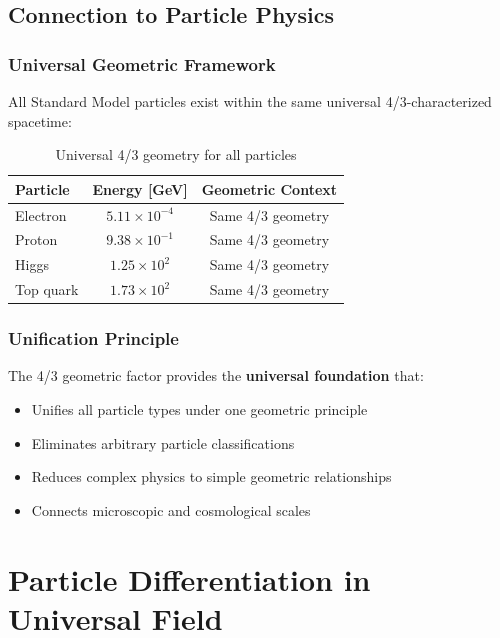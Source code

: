 	\subsection{Connection to Particle Physics}
	\label{subsec:connection_particle_physics}
	
	\subsubsection{Universal Geometric Framework}
	\label{subsubsec:universal_framework}
	
	All Standard Model particles exist within the same universal 4/3-characterized spacetime:
	
	\begin{table}[htbp]
		\centering
		\begin{tabular}{lcc}
			\toprule
			\textbf{Particle} & \textbf{Energy [GeV]} & \textbf{Geometric Context} \\
			\midrule
			Electron & $5.11 \times 10^{-4}$ & Same 4/3 geometry \\
			Proton & $9.38 \times 10^{-1}$ & Same 4/3 geometry \\
			Higgs & $1.25 \times 10^{2}$ & Same 4/3 geometry \\
			Top quark & $1.73 \times 10^{2}$ & Same 4/3 geometry \\
			\bottomrule
		\end{tabular}
		\caption{Universal 4/3 geometry for all particles}
		\label{tab:universal_geometry}
	\end{table}
	
	\subsubsection{Unification Principle}
	\label{subsubsec:unification_principle}
	
	The 4/3 geometric factor provides the \textbf{universal foundation} that:
	\begin{itemize}
		\item Unifies all particle types under one geometric principle
		\item Eliminates arbitrary particle classifications
		\item Reduces complex physics to simple geometric relationships
		\item Connects microscopic and cosmological scales
	\end{itemize}
	
	\section{Particle Differentiation in Universal Field}
	\label{sec:particle_differentiation}
	
